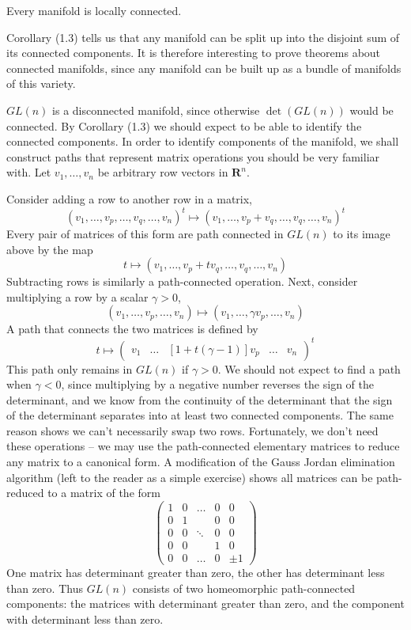 \begin{corollary}
    Every manifold is locally connected.
\end{corollary}

Corollary (1.3) tells us that any manifold can be split up into the disjoint sum of its connected components. It is therefore interesting to prove theorems about connected manifolds, since any manifold can be built up as a bundle of manifolds of this variety.

\begin{example}
    $GL(n)$ is a disconnected manifold, since otherwise $\det(GL(n))$ would be connected. By Corollary (1.3) we should expect to be able to identify the connected components. In order to identify components of the manifold, we shall construct paths that represent matrix operations you should be very familiar with. Let $v_1, \dots, v_n$ be arbitrary row vectors in $\mathbf{R}^n$.

    Consider adding a row to another row in a matrix,
    \[ (v_1, \dots, v_p, \dots, v_q, \dots, v_n)^t \mapsto (v_1, \dots, v_p + v_q, \dots, v_q, \dots, v_n)^t \]
    Every pair of matrices of this form are path connected in $GL(n)$ to its image above by the map
    \[ t \mapsto (v_1, \dots, v_p + t v_q, \dots, v_q, \dots, v_n) \]
    Subtracting rows is similarly a path-connected operation. Next, consider multiplying a row by a scalar $\gamma > 0$,
    \[ (v_1, \dots, v_p, \dots, v_n) \mapsto (v_1, \dots, \gamma v_p, \dots, v_n) \]
    A path that connects the two matrices is defined by
    \[ t \mapsto \begin{pmatrix} v_1 & \dots & [1 + t(\gamma - 1)]v_p & \dots & v_n \end{pmatrix}^t \]
    This path only remains in $GL(n)$ if $\gamma > 0$. We should not expect to find a path when $\gamma < 0$, since multiplying by a negative number reverses the sign of the determinant, and we know from the continuity of the determinant that the sign of the determinant separates into at least two connected components. The same reason shows we can't necessarily swap two rows. Fortunately, we don't need these operations -- we may use the path-connected elementary matrices to reduce any matrix to a canonical form. A modification of the Gauss Jordan elimination algorithm (left to the reader as a simple exercise) shows all matrices can be path-reduced to a matrix of the form
    \[ \begin{pmatrix} 1 & 0 & \dots & 0 & 0 \\ 0 & 1 & & 0 & 0 \\ 0 & 0 & \ddots & 0 & 0 \\ 0 & 0 &  & 1 & 0 \\ 0 & 0 & \dots & 0 & \pm 1 \end{pmatrix} \]
    One matrix has determinant greater than zero, the other has determinant less than zero. Thus $GL(n)$ consists of two homeomorphic path-connected components: the matrices with determinant greater than zero, and the component with determinant less than zero.
\end{example}

